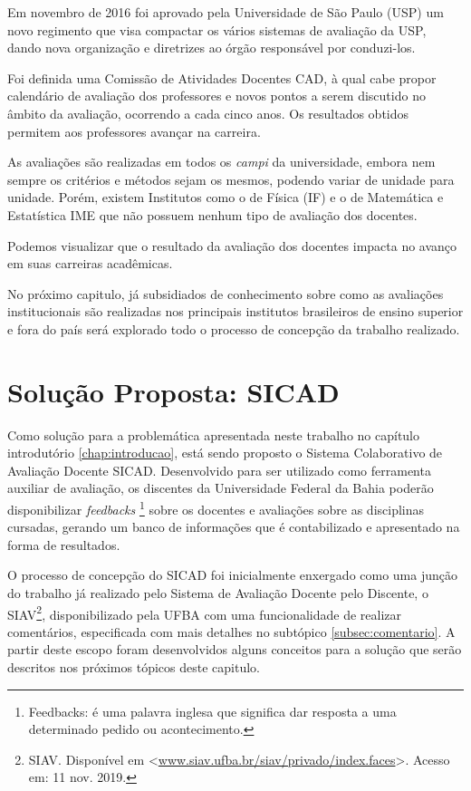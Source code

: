 \documentclass[12pt, a4paper]{report}
\begin{document}
Em novembro de 2016 foi aprovado pela Universidade de São Paulo (USP) um novo regimento que visa compactar os vários sistemas de avaliação da USP, dando nova organização e diretrizes ao órgão responsável por conduzi-los.

Foi definida uma Comissão de Atividades Docentes \ac{CAD}, à qual cabe propor calendário de avaliação dos professores e novos pontos a serem discutido no âmbito da avaliação, ocorrendo a cada cinco anos. Os resultados obtidos permitem aos professores avançar na carreira.

As avaliações são realizadas em todos os \textit{campi} da universidade, embora nem sempre os critérios e métodos sejam os mesmos, podendo variar de unidade para unidade. Porém, existem Institutos como o de Física (IF) e o de Matemática e Estatística \ac{IME} que não possuem nenhum tipo de avaliação dos docentes.

Podemos visualizar que o resultado da avaliação dos docentes impacta no avanço em suas carreiras acadêmicas.

No próximo capitulo, já subsidiados de conhecimento sobre como as avaliações institucionais são realizadas nos principais institutos brasileiros de ensino superior e fora do país será explorado todo o processo de concepção da trabalho realizado.


\chapter{Solução Proposta: SICAD}
\label{chap:solucaoproposta}

Como solução para a problemática apresentada neste trabalho no capítulo introdutório \ref{chap:introducao}, está sendo proposto o Sistema Colaborativo de Avaliação Docente \ac{SICAD}. Desenvolvido para ser utilizado como ferramenta auxiliar de avaliação, os discentes da Universidade Federal da Bahia poderão disponibilizar \textit{feedbacks} \footnote{Feedbacks: é uma palavra inglesa que significa dar resposta a uma determinado pedido ou acontecimento.} sobre os docentes e avaliações sobre as disciplinas cursadas, gerando um banco de informações que é contabilizado e apresentado na forma de resultados. 

O processo de concepção do \ac{SICAD} foi inicialmente enxergado como uma junção do trabalho já realizado pelo Sistema de Avaliação Docente pelo Discente, o \ac{SIAV}\footnote{SIAV. Disponível em <\url{www.siav.ufba.br/siav/privado/index.faces}>. Acesso em: 11 nov. 2019.}, disponibilizado pela \ac{UFBA} com uma funcionalidade de realizar comentários, especificada com mais detalhes no subtópico \ref{subsec:comentario}. A partir deste escopo foram desenvolvidos alguns conceitos para a solução que serão descritos nos próximos tópicos deste capitulo.
\end{document}
